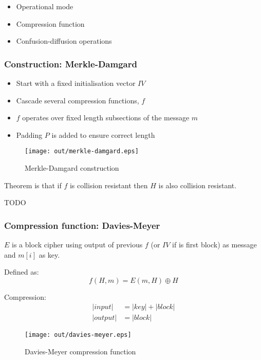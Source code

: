 \documentclass[a4paper]{article}
\begin{document}
\begin{itemize}
  \item Operational mode
  \item Compression function
  \item Confusion-diffusion operations
\end{itemize}

\subsubsection{Construction: Merkle-Damgard}

\begin{itemize}
  \item Start with a fixed initialisation vector $IV$
  \item Cascade several compression functions, $f$
  \item $f$ operates over fixed length subsections of the message $m$
  \item Padding $P$ is added to ensure correct length
\end{itemize}

\begin{figure}[h!]
  \centering
  \texttt{[image: out/merkle-damgard.eps]}
  \caption{Merkle-Damgard construction}
  \label{fig:merkle-damgard}
\end{figure}
\FloatBarrier

Theorem is that if $f$ is collision resistant then $H$ is also collision
resistant.


TODO

\subsubsection{Compression function: Davies-Meyer}

$E$ is a block cipher using output of previous $f$ (or $IV$ if is first block)
as message and $m[i]$ as key.

Defined as:
\[
  f(H, m) = E(m, H) \oplus H
\]

Compression:
\begin{align*}
   |input| &= |key| + |block| \\
  |output| &= |block|
\end{align*}

\begin{figure}[h!]
  \centering
  \texttt{[image: out/davies-meyer.eps]}
  \caption{Davies-Meyer compression function}
  \label{fig:davies-meyer}
\end{figure}
\FloatBarrier
\end{document}
